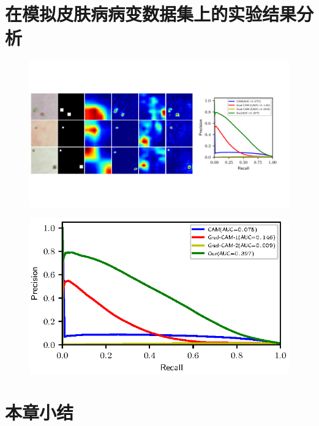\section{在模拟皮肤病病变数据集上的实验结果分析}

\begin{figure}[h]
	\centering
	\includegraphics[width=1.0\textwidth]{figure/pr_curve_skin_image.pdf}
	\caption{} 
	\label{fig:simulated_skin}
\end{figure}


\begin{figure}[h]
	\centering
	\includegraphics[width=1.0\textwidth]{figure/pr_curve_skin_image/pr_curve.eps}
	\caption{}
	\label{fig:simulated_skin_pr_curve}
\end{figure}
\section{本章小结}



